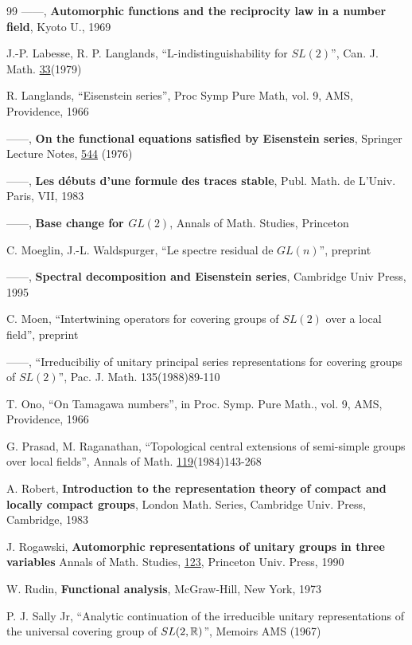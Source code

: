 \begin{thebibliography}{99}
 ------, {\bf Automorphic functions and the reciprocity
law in a number field}, Kyoto U., 1969

J.-P. Labesse, R. P. Langlands, ``L-indistinguishability for $SL(2)$'',
Can. J. Math. \underline{33}(1979)

 R. Langlands, ``Eisenstein series'', Proc Symp Pure Math,
vol. 9, AMS,
Providence, 1966

 ------, {\bf On the functional equations satisfied
by Eisenstein series}, Springer Lecture Notes, \underline{544} (1976)

 ------, {\bf Les d\'ebuts d'une formule des traces 
stable}, Publ. Math. de L'Univ. Paris, VII, 1983

 ------, {\bf Base change for $GL(2)$},
Annals of Math. Studies, Princeton

 C. Moeglin, J.-L. Waldspurger,
``Le spectre residual de $GL(n)$'', preprint

 ------,
{\bf Spectral decomposition and Eisenstein series},
Cambridge Univ Press, 1995

 C. Moen, ``Intertwining operators for covering groups
of $SL(2)$ over
a local field'', preprint

 ------, ``Irreducibiliy of unitary principal series
representations
for covering groups of $SL(2)$'', Pac. J. Math. 135(1988)89-110

 T. Ono, ``On Tamagawa numbers'', in Proc. Symp. Pure Math.,
vol. 9, AMS,
Providence, 1966

 G. Prasad, M. Raganathan,
``Topological central extensions of
semi-simple groups over local fields'', Annals of Math.
\underline{119}(1984)143-268

 A. Robert, {\bf Introduction to the
representation theory of compact and locally compact groups},
London Math. Series, Cambridge Univ. Press, Cambridge, 1983

 J. Rogawski,
{\bf Automorphic representations of unitary groups
in three variables}
Annals of Math. Studies, \underline{123}, Princeton Univ. Press, 1990

 W. Rudin, {\bf Functional analysis}, 
McGraw-Hill, New
York, 1973

P. J. Sally Jr, ``Analytic continuation of the irreducible unitary
representations of the universal covering group
of $SL(2,{\Bbb{R}})$'', Memoirs AMS (1967)


\end{thebibliography}
